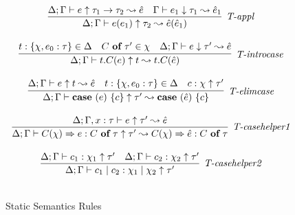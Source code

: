 \begin{figure}
\[\begin{array}{c}
\infer[\textit{T-appl}]
	{\Delta; \Gamma \vdash  e(e_1) \uparrow\tau_2  \leadsto \hat{e}(\hat{e}_1) } 
	{\Delta; \Gamma \vdash e \uparrow \tau_1 \rightarrow \tau_2  \leadsto \hat{e}  & \Gamma \vdash e_1 \downarrow \tau_1 \leadsto \hat{e}_1 }\\[3ex]

\infer[\textit{T-introcase}]
	{\Delta; \Gamma \vdash  t.C(e) \uparrow t  \leadsto t.C(\hat{e}) } 
	{t:\{\chi, e_0:\tau\} \in \Delta & C\ \keyw{of}\ \tau' \in \chi &\Delta; \Gamma \vdash e \downarrow \tau'  \leadsto \hat{e}}\\[3ex]

\infer[\textit{T-elimcase}]
	{\Delta; \Gamma \vdash  \keyw{case}~(e)~\{ c \} \uparrow\tau'  \leadsto \keyw{case}~(\hat{e})~\{ c \} } 
	{\Delta; \Gamma \vdash e \uparrow t  \leadsto \hat{e}  & t:\{ \chi,e_0:\tau\} \in \Delta & c:\chi \uparrow \tau'}\\[3ex]

\infer[\textit{T-casehelper1}]
	{\Delta; \Gamma \vdash  C(\chi)\Rightarrow e : C\ \keyw{of}\ \tau \uparrow \tau' \leadsto C(\chi)\Rightarrow \hat{e} : C\ \keyw{of}\ \tau} 
	{\Delta; \Gamma, x:\tau \vdash e \uparrow \tau' \leadsto \hat{e}}\\[3ex]

\infer[\textit{T-casehelper2}]
	{\Delta; \Gamma \vdash  c_1 \bnfalt c_2: \chi_1 \bnfalt \chi_2 \uparrow \tau' } 
	{\Delta; \Gamma \vdash c_1:\chi_1 \uparrow \tau' & \Delta; \Gamma \vdash c_2:\chi_2 \uparrow \tau'}\\[3ex]


\end{array}
\]
\caption{Static Semantics Rules}
\end{figure}

